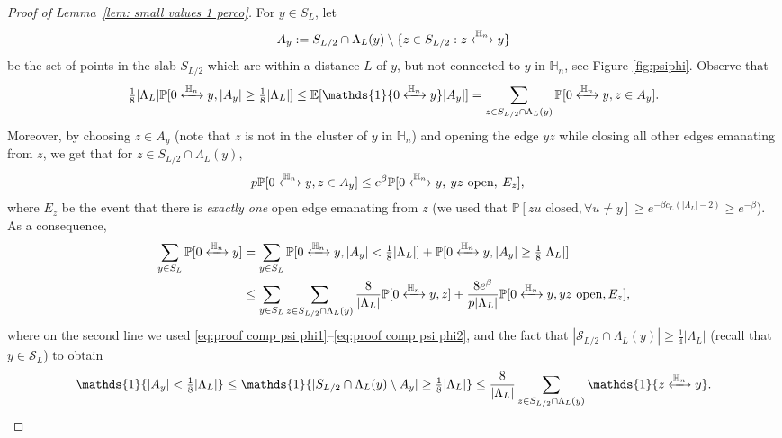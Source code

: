 \documentclass[11pt,a4paper]{article}
\numberwithin{equation}{section}
\theoremstyle{plain}
\theoremstyle{definition}
\newcommand{\connect}{\xleftrightarrow}
\begin{document}
\begin{proof}[Proof of Lemma~\textup{\ref{lem: small values 1 perco}}]
For $y\in S_L$, let
\begin{equation}
A_y:=S_{L/2}\cap \Lambda_L(y)\setminus\{z\in S_{L/2}:z\connect{\mathbb H_n\:}y\}
\end{equation}
be the set of points in the slab $S_{L/2}$ which are within a distance $L$ of $y$, but not connected to $y$ in $\mathbb H_n$, see Figure \ref{fig:psiphi}. Observe that
\begin{equation}\label{eq:proof comp psi phi1}
	\tfrac18|\Lambda_L|\mathbb P[0\connect{\mathbb H_n\:}y,|A_y|\ge\tfrac18|\Lambda_L|]\le \mathbb E[\mathds{1}\{0\connect{\mathbb H_n\:}y\}|A_y|]=\sum_{z\in S_{L/2}\cap \Lambda_L(y)}\mathbb P[0\connect{\mathbb H_n\:}y,z\in A_y].
\end{equation}
Moreover, by choosing $z\in A_y$ (note that $z$ is not in the cluster of $y$ in $\mathbb H_n$) and opening the edge $yz$ while closing all other edges emanating from $z$, we get that for $z\in S_{L/2}\cap \Lambda_L(y)$,
\begin{align}\label{eq:proof comp psi phi2}
p&\mathbb P[0\connect{\mathbb H_n\:}y,z\in A_y]
\le e^{\beta} \mathbb P[0\connect{\mathbb H_n\:}y, \: yz \text{ open},\: E_z],
\end{align}
where $E_z$ be the event that there is {\em exactly one} open edge emanating from $z$ (we used that $\mathbb P[zu \text{ closed}, \forall u\neq y]\geq e^{-\beta c_L(|\Lambda_L|-2)}\ge e^{-\beta}$). As a consequence,
\begin{align}
\sum_{y\in S_L}\mathbb P[0\connect{\mathbb H_n\:}y]&= \sum_{y\in S_L}\mathbb P[0\connect{\mathbb H_n\:}y,|A_y|< \tfrac18|\Lambda_L|]+\mathbb P[0\connect{\mathbb H_n\:}y,|A_y|\ge \tfrac18|\Lambda_L|]\\
&\le \sum_{y\in S_L}\sum_{z\in S_{L/2}\cap\Lambda_L(y)}\frac{8}{|\Lambda_L|}\mathbb P[0\connect{\mathbb H_n\:}y,z]+ \frac{8e^\beta}{p|\Lambda_L|}\mathbb P[0\connect{\mathbb H_n\:}y,yz\text{ open},E_z],\label{eq:proof comp psi phi3}
\end{align}
where on the second line we used \eqref{eq:proof comp psi phi1}--\eqref{eq:proof comp psi phi2}, and the fact that $|\mathcal S_{L/2}\cap \Lambda_L(y)|\geq \tfrac{1}{4}|\Lambda_L|$ (recall that $y\in \mathcal S_L$) to obtain
\begin{equation}
\mathds{1}\{|A_y|<\tfrac{1}{8}|\Lambda_L|\}\leq\mathds{1}\{|S_{L/2}\cap \Lambda_L(y)\setminus A_y|\geq\tfrac{1}{8}|\Lambda_L|\}\leq \frac{8}{|\Lambda_L|}\sum_{z\in S_{L/2}\cap \Lambda_L(y)}\mathds{1}\{z\connect{\mathbb H_n\:}y\}.

\end{equation}
\end{proof}
\end{document}

